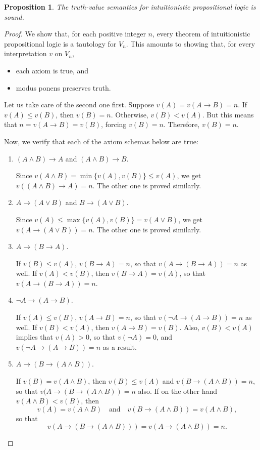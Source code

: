 \documentclass[12pt]{article}
\newtheorem{prop}{Proposition}
\begin{document}
\begin{prop} The truth-value semantics for intuitionistic propositional logic is sound. \end{prop}
\begin{proof}
We show that, for each positive integer $n$, every theorem of intuitionistic propositional logic is a tautology for $V_n$.  This amounts to showing that, for every interpretation $v$ on $V_n$,
\begin{itemize}
\item
each axiom is true, and
\item 
modus ponens preserves truth.
\end{itemize}
Let us take care of the second one first.  Suppose $v(A)=v(A\to B)=n$.  If $v(A)\le v(B)$, then $v(B)=n$.  Otherwise, $v(B)<v(A)$.  But this means that $n=v(A\to B)=v(B)$, forcing $v(B)=n$.  Therefore, $v(B)=n$.

Now, we verify that each of the axiom schemas below are true:

\begin{enumerate}
\item $(A \land B) \to A$ and $(A\land B)\to B$.

Since $v(A\land B)=\min\lbrace v(A),v(B)\rbrace \le v(A)$, we get $v((A\land B)\to A)=n$.  The other one is proved similarly.

\item $A \to (A \lor B)$ and $B \to (A\lor B)$.

Since $v(A) \le \max\lbrace v(A),v(B)\rbrace = v(A\lor B)$, we get $v(A\to (A\lor B))=n$.  The other one is proved similarly.

\item $A \to (B \to A)$.

If $v(B)\le v(A)$, $v(B\to A)=n$, so that $v(A\to (B\to A))=n$ as well.  If $v(A)<v(B)$, then $v(B\to A)=v(A)$, so that $v(A\to (B\to A))=n$.

\item $\neg A \to  (A \to B)$.

If $v(A)\le v(B)$, $v(A\to B)=n$, so that $v(\neg A\to (A\to B))=n$ as well.  If $v(B)<v(A)$, then $v(A\to B)=v(B)$.  Also, $v(B)<v(A)$ implies that $v(A)>0$, so that $v(\neg A)=0$, and $v(\neg A\to (A\to B))=n$ as a result.

\item $A \to (B \to (A \land B))$.

If $v(B)=v(A\land B)$, then $v(B)\le v(A)$ and $v(B\to (A\land B))=n$, so that $v(A\to (B\to (A\land B))=n$ also.  If on the other hand $v(A\land B)<v(B)$, then $$v(A)=v(A\land B) \quad \mbox{and} \quad v(B\to (A\land B))=v(A\land B),$$ so that 
$$v(A \to (B\to (A\land B)))= v(A\to (A\land B)) = n.$$


\end{enumerate}
\end{proof}
\end{document}
